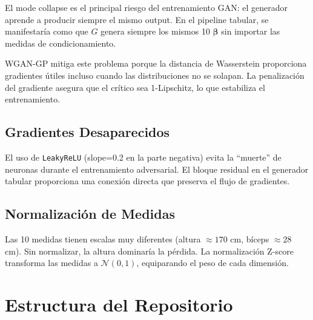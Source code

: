 \documentclass[a4paper,11pt]{article}
\begin{document}
El mode collapse es el principal riesgo del entrenamiento GAN: el generador
aprende a producir siempre el mismo output. En el pipeline tabular, se
manifestaría como que $G$ genera siempre los mismos 10 $\bm{\beta}$ sin
importar las medidas de condicionamiento.

WGAN-GP mitiga este problema porque la distancia de Wasserstein proporciona
gradientes útiles incluso cuando las distribuciones no se solapan. La
penalización del gradiente asegura que el crítico sea 1-Lipschitz, lo que
estabiliza el entrenamiento.

\subsection{Gradientes Desaparecidos}

El uso de \texttt{LeakyReLU} (slope=0.2 en la parte negativa) evita la
``muerte'' de neuronas durante el entrenamiento adversarial. El bloque
residual en el generador tabular proporciona una conexión directa que
preserva el flujo de gradientes.

\subsection{Normalización de Medidas}

Las 10 medidas tienen escalas muy diferentes (altura $\approx170$ cm,
bíceps $\approx28$ cm). Sin normalizar, la altura dominaría la pérdida.
La normalización Z-score transforma las medidas a $\mathcal{N}(0,1)$,
equiparando el peso de cada dimensión.

\section{Estructura del Repositorio}
\end{document}
